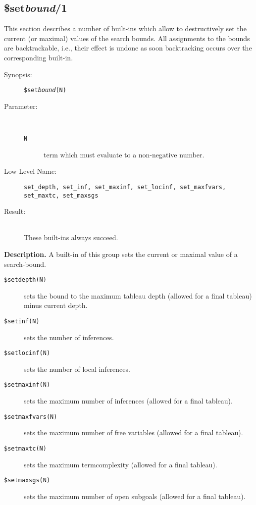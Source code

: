 %
%
%
\subsection{\$set{\em bound\/}/1}

This section describes a number of built-ins which allow to destructively 
set the current (or maximal) values of the search bounds.
All assignments to the bounds are backtrackable, i.e., their effect
is undone as soon backtracking occurs over the corresponding built-in.
\begin{description}
\item[Synopsis:]
	{\tt \$set{\em bound}(N)}
\item[Parameter:]\ \\[-0.5cm]
	\begin{description}
	\item[{\tt N}] term which must evaluate to a non-negative number.
	\end{description}
\item[Low Level Name:]
	{\tt set\_depth, set\_inf, set\_maxinf, set\_locinf, set\_maxfvars,
	     set\_maxtc, set\_maxsgs}
\item[Result:]\ \\
These built-ins always succeed.
\end{description}

\vspace*{0.5cm}
\noindent
{\bf Description.}
A built-in of this group sets the current or maximal value
of a search-bound.
\begin{description}
\item[{\tt \$setdepth(N)}]
            sets the bound to the maximum tableau depth
            (allowed for a final tableau) minus current depth.
\item[{\tt \$setinf(N)}]
            sets the number
            of inferences.
\item[{\tt \$setlocinf(N)}]
            sets the number
            of local inferences.
\item[{\tt \$setmaxinf(N)}]
            sets the maximum number
            of inferences (allowed for a final tableau).
\item[{\tt \$setmaxfvars(N)}]
            sets the maximum number
            of free variables (allowed for a final tableau).
\item[{\tt \$setmaxtc(N)}]
            sets the maximum termcomplexity
            (allowed for a final tableau).
\item[{\tt \$setmaxsgs(N)}]
            sets the maximum number
            of open subgoals (allowed for a final tableau).
\end{description}

